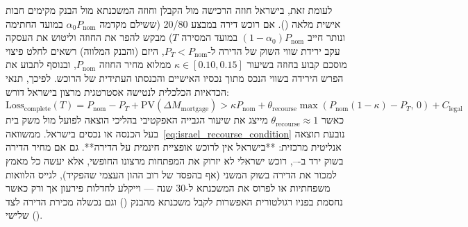 לעומת זאת, בישראל חוזה הרכישה מול הקבלן וחוזה המשכנתא מול הבנק מקימים חבות אישית מלאה (). אם רוכש דירה במבצע \num{20/80} (ששילם מקדמה $\alpha_0 P_{\text{nom}}$ במועד החתימה ונותר חייב $\left(1-\alpha_0\right)P_{\text{nom}}$ במועד המסירה $T$) מבקש להפר את החוזה וליטוש את העסקה עקב ירידת שווי השוק של הדירה ל-$P_T < P_{\text{nom}}$, היזם (והבנק המלווה) רשאים לחלט פיצוי מוסכם קבוע בחוזה בשיעור $\kappa \in [0.10, 0.15]$ ממלוא מחיר החוזה $P_{\text{nom}}$, ובנוסף לתבוע את הפרש הירידה בשווי הנכס מתוך נכסיו האישיים והכנסתו העתידית של הרוכש. לפיכך, תנאי הכדאיות הכלכלית לנטישה אסטרטגית מרצון בישראל דורש:
\begin{equation}
\label{eq:israel_recourse_condition}
\text{Loss}_{\text{complete}}\left(T\right) = P_{\text{nom}} - P_T + \text{PV}\left(\Delta M_{\text{mortgage}}\right) > \kappa P_{\text{nom}} + \theta_{\text{recourse}}\max\left(P_{\text{nom}}\left(1-\kappa\right) - P_T,\, 0\right) + C_{\text{legal}}
\end{equation}
כאשר $\theta_{\text{recourse}} \approx 1$ מייצג את שיעור הגבייה האפקטיבי בהליכי הוצאה לפועל מול משק בית בעל הכנסה או נכסים בישראל. ממשוואה~\eqref{eq:israel_recourse_condition} נובעת תוצאה אנליטית מרכזית: **בישראל אין לרוכש אופציית  חינמית על הדירה**. גם אם מחיר הדירה בשוק ירד ב---, רוכש ישראלי לא יזרוק את המפתחות מרצונו החופשי, אלא יעשה כל מאמץ למכור את הדירה בשוק המשני (אף בהפסד של רוב ההון העצמי שהפקיד), לגייס הלוואות משפחתיות או לפרוס את המשכנתא ל-\num{30} שנה — וייקלע לחדלות פירעון אך ורק כאשר נחסמת בפניו רגולטורית האפשרות לקבל משכנתא מהבנק () וגם נכשלה מכירת הדירה לצד שלישי ().

